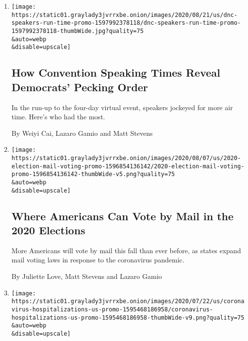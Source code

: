 \begin{enumerate}
\def\labelenumi{\arabic{enumi}.}
\item
  \href{/interactive/2020/08/21/us/politics/dnc-speakers-run-time.html}{}

  \texttt{[image: https://static01.graylady3jvrrxbe.onion/images/2020/08/21/us/dnc-speakers-run-time-promo-1597992378118/dnc-speakers-run-time-promo-1597992378118-thumbWide.jpg?quality=75\\\&auto=webp\\\&disable=upscale]}

  \hypertarget{how-convention-speaking-times-reveal-democrats-pecking-order}{%
  \subsection{How Convention Speaking Times Reveal Democrats' Pecking
  Order}\label{how-convention-speaking-times-reveal-democrats-pecking-order}}

  In the run-up to the four-day virtual event, speakers jockeyed for
  more air time. Here's who had the most.

  By Weiyi Cai, Lazaro Gamio and Matt Stevens
\item
  \href{/interactive/2020/08/11/us/politics/vote-by-mail-us-states.html}{}

  \texttt{[image: https://static01.graylady3jvrrxbe.onion/images/2020/08/07/us/2020-election-mail-voting-promo-1596854136142/2020-election-mail-voting-promo-1596854136142-thumbWide-v5.png?quality=75\\\&auto=webp\\\&disable=upscale]}

  \hypertarget{where-americans-can-vote-by-mail-in-the-2020-elections}{%
  \subsection{Where Americans Can Vote by Mail in the 2020
  Elections}\label{where-americans-can-vote-by-mail-in-the-2020-elections}}

  More Americans will vote by mail this fall than ever before, as states
  expand mail voting laws in response to the coronavirus pandemic.

  By Juliette Love, Matt Stevens and Lazaro Gamio
\item
  \href{/interactive/2020/07/23/us/coronavirus-hospitalizations-us.html}{}

  \texttt{[image: https://static01.graylady3jvrrxbe.onion/images/2020/07/22/us/coronavirus-hospitalizations-us-promo-1595468186958/coronavirus-hospitalizations-us-promo-1595468186958-thumbWide-v9.png?quality=75\\\&auto=webp\\\&disable=upscale]}


\end{enumerate}
